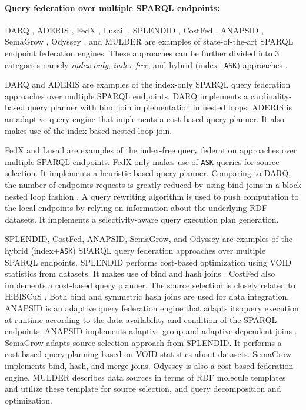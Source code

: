 \paragraph*{\textbf{Query federation over multiple SPARQL endpoints:}}

DARQ \cite{darq2008}, ADERIS \cite{aderis2011}, FedX \cite{fedx2011}, Lusail \cite{abdelaziz2017lusail}, SPLENDID \cite{splendid2011}, CostFed \cite{saleem2018costfed}, ANAPSID \cite{anapsid2011}, SemaGrow \cite{semagrow2015}, Odyssey \cite{odyssey2017}, and MULDER \cite{endris2018querying} are examples of state-of-the-art SPARQL endpoint federation engines. These approaches can be further divided into 3 categories namely \emph{index-only}, \emph{index-free}, and hybrid (index+\texttt{ASK}) approaches \cite{saleem2015fine}. 

DARQ and ADERIS are examples of the index-only SPARQL query federation approaches over multiple SPARQL endpoints. DARQ implements a cardinality-based query planner with bind join implementation in nested loops. ADERIS is an adaptive query engine that implements a cost-based query planner. It also makes use of the index-based nested loop join. 

FedX and Lusail are examples of the index-free query federation approaches over multiple SPARQL endpoints. 
FedX only makes use of \texttt{ASK} queries for source selection. It implements a heuristic-based query planner. Comparing to DARQ, the number of endpoints requests is greatly reduced by using bind joins in a block nested loop fashion \cite{fedx2011}. A query rewriting algorithm is used to
push computation to the local endpoints by relying on information about the underlying RDF datasets. It implements a selectivity-aware query execution plan generation. 

SPLENDID, CostFed, ANAPSID, SemaGrow, and Odyssey are examples of the hybrid (index+\texttt{ASK}) SPARQL query federation approaches over multiple SPARQL endpoints. SPLENDID performs cost-based optimization using VOID statistics from datasets. It makes use of bind and hash joins \cite{saleem2015fine}. %
CostFed also implements a cost-based query planner. The source selection is closely related to HiBISCuS \cite{hibiscus2014}. Both bind and symmetric hash joins are used for data integration. ANAPSID \cite{anapsid2011} is an adaptive query federation engine that adapts its query execution at runtime according to the data availability and condition of the SPARQL endpoints.  ANAPSID implements adaptive group and adaptive dependent joins \cite{saleem2015fine}. SemaGrow adapts source selection approach from SPLENDID. It performs a cost-based query planning based on VOID statistics about datasets. SemaGrow implements bind, hash, and merge joins. Odyssey is also a cost-based federation engine. MULDER describes data sources in terms of RDF molecule templates and utilize these template for source selection, and query decomposition and optimization.


